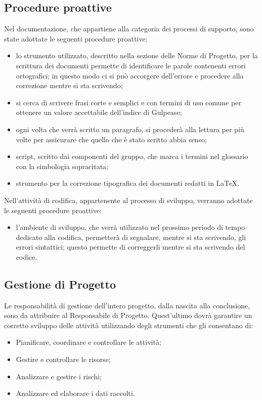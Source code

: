 \subsection{Procedure proattive}
Nel  documentazione, che appartiene alla categoria dei processi di supporto, sono state adottate le seguenti procedure proattive:
\begin{itemize}
\item {} lo strumento utilizzato, descritto nella sezione delle Norme di Progetto, per la scrittura dei documenti permette di identificare le parole contenenti errori ortografici; in questo modo ci si può accorgere dell'errore e procedere alla correzione mentre si sta scrivendo;
\item {} si cerca di scrivere frasi corte e semplici e con termini di uso comune per ottenere un valore accettabile dell'indice di Gulpease;
\item {} ogni volta che verrà scritto un paragrafo, si procederà alla lettura per più volte per assicurare che quello che è stato scritto abbia senso;
\item {} script, scritto dai componenti del gruppo, che marca i termini nel glossario con la simbologia sopracitata;
\item {} strumento per la correzione tipografica dei documenti redatti in \LaTeX .
\end{itemize}
Nell'attività di codifica, appartenente al processo di sviluppo, verranno adottate le seguenti procedure proattive:
\begin{itemize}
\item {} l'ambiente di sviluppo, che verrà utilizzato nel prossimo periodo di tempo dedicato alla codifica, permetterà di segnalare, mentre si sta scrivendo, gli errori sintattici; questo permette di correggerli mentre si sta scrivendo del codice.
\end{itemize}

\subsection{Gestione di Progetto}
Le responsabilità di gestione dell’intero progetto, dalla nascita alla conclusione, sono da
attribuire al Responsabile di Progetto.
Quest’ultimo dovrà garantire un corretto sviluppo delle attività utilizzando degli strumenti che gli consentano di:
\begin{itemize}
\item Pianificare, coordinare e controllare le attività;
\item Gestire e controllare le risorse;
\item Analizzare e gestire i rischi;
\item Analizzare ed elaborare i dati raccolti.
\end{itemize}

